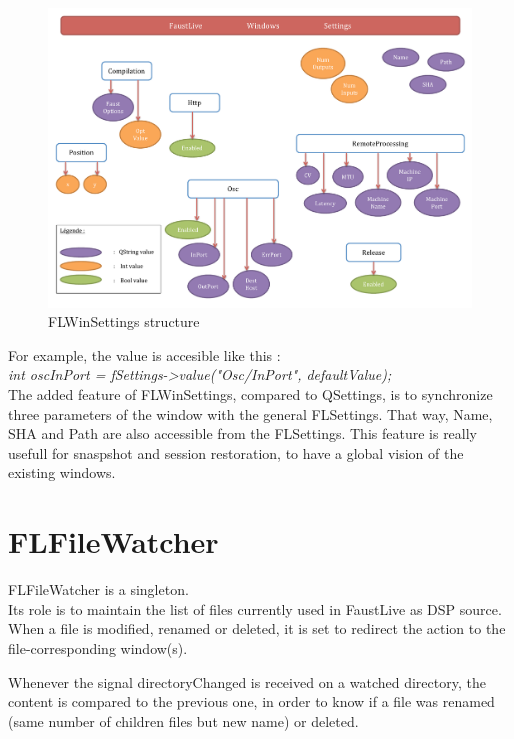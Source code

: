 \documentclass[a4paper]{article}
\begin{document}
{\begin{figure}[!h]
\begin{center}
\includegraphics[width=\columnwidth]{images/FLWinSettings}
\caption{FLWinSettings structure}
\label{fig:FLWinSettings}
\end{center}
\end{figure}


For example, the value is accesible like this :\\
\textit{int oscInPort = fSettings->value("Osc/InPort", defaultValue);} \\

The added feature of FLWinSettings, compared to QSettings, is to synchronize three parameters of the window with the general FLSettings. That way, Name, SHA and Path are also accessible from the FLSettings. This feature is really usefull for snaspshot and session restoration, to have a global vision of the existing windows.

\section{FLFileWatcher}

FLFileWatcher is a singleton. \\
Its role is to maintain the list of files currently used in FaustLive as DSP source. When a file is modified, renamed or deleted, it is set to redirect the action to the file-corresponding window(s).

Whenever the signal directoryChanged is received on a watched directory, the content is compared to the previous one, in order to know if a file was renamed (same number of children files but new name) or deleted. 

}
\end{document}
